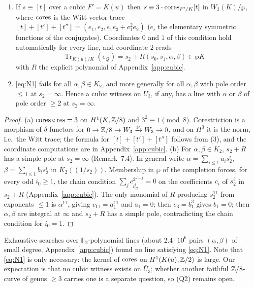 \begin{proposition}\label{prop:D}
\begin{enumerate}
\item[(a)] If $s\equiv[t]$ over a cubic $F'=K(u)$ then $s\equiv3\cdot\operatorname{cores}_{F'/K}[t]$ in
$W_3(K)/\wp$, where $\operatorname{cores}$ is the Witt-vector trace
$[t]+[t']+[t'']=(e_1,e_2,e_1e_3+e_1^2e_2)$ ($e_i$ the elementary symmetric functions of
the conjugates). Coordinates $0$ and $1$ of this condition hold automatically for every
line, and coordinate $2$ reads
\begin{equation}\label{eq:N1}
\operatorname{Tr}_{K(u)/K}(e_Q)=s_2+R(s_0,s_1,\alpha,\beta)\in\wp K
\end{equation}
with $R$ the explicit polynomial of Appendix~\ref{app:cubic}.
\item[(b)] \eqref{eq:N1} fails for all $\alpha,\beta\in K_2$, and more generally for all
$\alpha,\beta$ with pole order $\le1$ at $s_2=\infty$. Hence a cubic witness on
$\bar U_3$, if any, has a line with $\alpha$ or $\beta$ of pole order $\ge2$ at
$s_2=\infty$.
\end{enumerate}
\end{proposition}

\begin{proof}
(a) $\operatorname{cores}\circ\operatorname{res}=3$ on $H^1(K,\mathbb Z/8)$ and $3^2\equiv1\pmod8$. Corestriction is a
morphism of $\delta$-functors for $0\to\mathbb Z/8\to W_3\xrightarrow{\wp}W_3\to0$, and on
$H^0$ it is the norm, i.e.\ the Witt trace; the formula for $[t]+[t']+[t'']$ follows from
(3), and the coordinate computations are in Appendix~\ref{app:cubic}. (b) For
$\alpha,\beta\in K_2$, $s_2+R$ has a simple pole at $s_2=\infty$ (Remark~7.4). In
general write $\alpha=\sum_{i\le1}a_is_2^i$, $\beta=\sum_{i\le1}b_is_2^i$ in
$K_2((1/s_2))$. Membership in $\wp$ of the completion forces, for every odd $i_0\ge1$, the
chain condition $\sum_{j}c_{i_02^j}^{2^{J-j}}=0$ on the coefficients $c_i$ of $s_2^i$ in
$s_2+R$ (Appendix~\ref{app:cubic}). The only monomial of $R$ producing $s_2^{11}$ from
exponents $\le1$ is $\alpha^{11}$, giving $c_{11}=a_1^{11}$ and $a_1=0$; then
$c_3=b_1^3$ gives $b_1=0$; then $\alpha,\beta$ are integral at $\infty$ and
$s_2+R$ has a simple pole, contradicting the chain condition for $i_0=1$.
\end{proof}

Exhaustive searches over $\mathbb F_2$-polynomial lines (about $2.4\cdot10^6$ pairs
$(\alpha,\beta)$ of small degree, Appendix~\ref{app:cubic}) found no line satisfying
\eqref{eq:N1}. Note that \eqref{eq:N1} is only necessary: the kernel of $\operatorname{cores}$ on
$H^1(K(u),\mathbb Z/2)$ is large. Our expectation is that no cubic witness exists on
$\bar U_3$; whether another faithful $\mathbb Z/8$-curve of genus $\ge3$ carries one is a
separate question, so (Q2) remains open.

